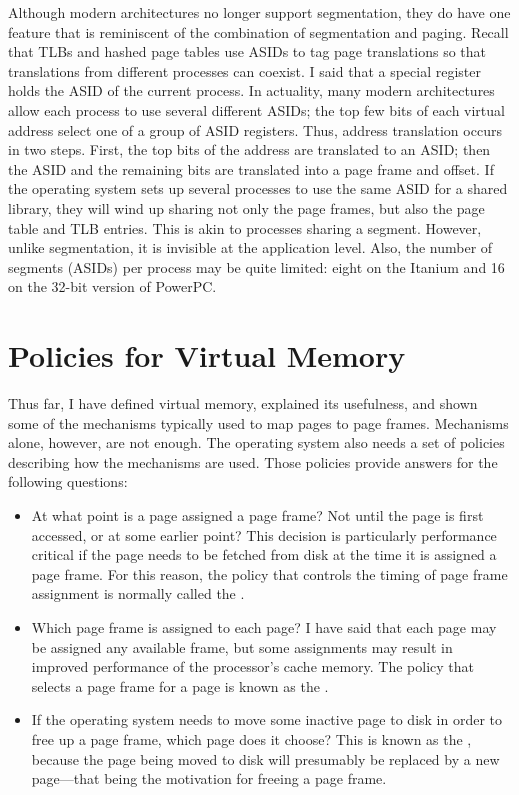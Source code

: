 Although modern architectures no longer support segmentation, they do have one
feature that is reminiscent of the combination of segmentation and
paging.  Recall that TLBs and hashed page tables use ASIDs to tag page
translations so that translations from different processes can
coexist.  I said that a special register holds the ASID of the
current process.  In actuality, many modern architectures allow each
process to use several different ASIDs; the top few bits of each
virtual address select one of a group of ASID registers.  Thus,
address translation occurs in two steps.  First, the top bits of the
address are translated to an ASID; then the ASID and the remaining
bits are translated into a page frame and offset.  If the operating
system sets up several processes to use the same ASID for a shared
library, they will wind up sharing not only the page frames, but also
the page table and TLB entries.  This is akin to processes sharing a
segment.  However, unlike segmentation, it is invisible at the
application level.  Also, the number of segments (ASIDs) per process
may be quite limited: eight on the Itanium and 16 on the 32-bit
version of PowerPC.

\section{Policies for Virtual Memory}\label{vm-policies-section}

Thus far, I have defined virtual memory, explained its usefulness,
and shown some of the mechanisms typically used to map pages to page
frames.  Mechanisms alone, however, are not enough.  The operating
system also needs a set of policies describing how the mechanisms are
used.  Those policies provide answers for the following questions:
\begin{itemize}
\item
At what point is a page assigned a page frame?  Not until the page is
first accessed, or at some earlier point?  This decision is
particularly performance critical if the page needs to be fetched from
disk at the time it is assigned a page frame.  For this reason, the
policy that controls the timing of page frame assignment is normally
called the .
\item
Which page frame is assigned to each page?  I have said that each
page may be assigned any available frame, but some assignments may
result in improved performance of the processor's cache memory.  The
policy that selects a page frame for a page is known as the
.
\item
If the operating system needs to move some inactive page to disk in
order to free up a page frame, which page does it choose?  This is
known as the , because the page being
moved to disk will presumably be replaced by a new page---that being
the motivation for freeing a page frame.
\end{itemize}

